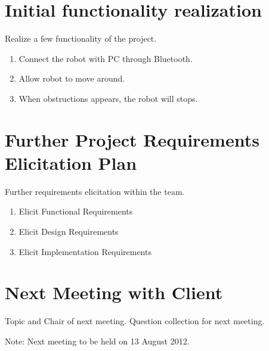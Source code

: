 \documentclass[11pt, a4paper]{article}
\begin{document}
\section{Initial functionality realization}
Realize a few functionality of the project. 
\begin{enumerate}
\item Connect the robot with PC through Bluetooth.
\item Allow robot to move around. 
\item When obstructions appears, the robot will stops. 
\end{enumerate}

\section{Further Project Requirements Elicitation Plan}
Further requirements elicitation within the team. 
\begin{enumerate}

\item Elicit Functional Requirements

\item Elicit Design Requirements

\item Elicit Implementation Requirements

\end{enumerate}



\section{Next Meeting with Client}
Topic and Chair of next meeting. Question collection for next meeting. 

\vspace*{10pt}
\noindent Note: Next meeting to be held on 13 August 2012.
\end{document}
